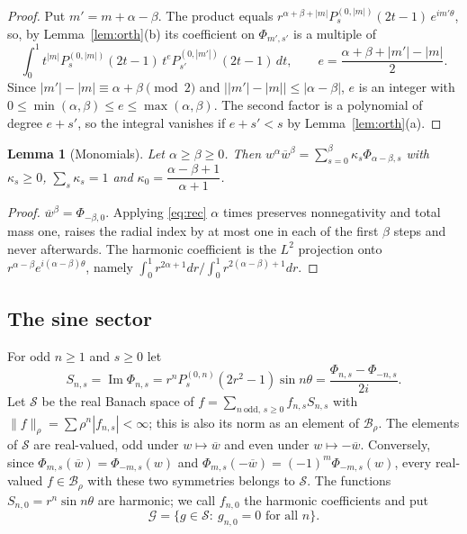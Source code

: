 \documentclass[11pt]{amsart}
\newtheorem{lemma}[theorem]{Lemma}
\theoremstyle{definition}
\theoremstyle{remark}
\numberwithin{equation}{section}
\newcommand{\Sc}{\mathcal{S}}
\newcommand{\Gc}{\mathcal{G}}
\newcommand{\Bc}{\mathcal{B}}
\newcommand{\bw}{\overline{w}}
\DeclareMathOperator{\im}{Im}
\newcommand{\nrm}[1]{\lVert #1\rVert}
\begin{document}
\begin{proof}
Put $m'=m+\alpha-\beta$. The product equals $r^{\alpha+\beta+|m|}P^{(0,|m|)}_s(2t-1)\,e^{im'\theta}$, so, by Lemma~\ref{lem:orth}(b) its coefficient on $\Phi_{m',s'}$ is a multiple of
\[
\int_0^1t^{|m|}P^{(0,|m|)}_s(2t-1)\,t^{e}P^{(0,|m'|)}_{s'}(2t-1)\,dt,\qquad e=\frac{\alpha+\beta+|m'|-|m|}2 .
\]
Since $|m'|-|m|\equiv\alpha+\beta\pmod 2$ and $\big||m'|-|m|\big|\leq|\alpha-\beta|$, $e$ is an integer with $0\leq\min(\alpha,\beta)\leq e\leq\max(\alpha,\beta)$. The second factor is a polynomial of degree $e+s'$, so the integral vanishes if $e+s'<s$ by Lemma~\ref{lem:orth}(a).
\end{proof}

\begin{lemma}[Monomials]\label{lem:monomial}
Let $\alpha\geq\beta\geq0$. Then $w^\alpha\bw^\beta=\sum_{s=0}^{\beta}\kappa_s\Phi_{\alpha-\beta,s}$ with $\kappa_s\geq0$, $\sum_s\kappa_s=1$ and $\kappa_0=\dfrac{\alpha-\beta+1}{\alpha+1}$.
\end{lemma}

\begin{proof}
$\bw^\beta=\Phi_{-\beta,0}$. Applying \eqref{eq:rec} $\alpha$ times preserves nonnegativity and total mass one, raises the radial index by at most one in each of the first $\beta$ steps and never afterwards. The harmonic coefficient is the $L^2$ projection onto $r^{\alpha-\beta}e^{i(\alpha-\beta)\theta}$, namely $\int_0^1r^{2\alpha+1}dr\big/\int_0^1r^{2(\alpha-\beta)+1}dr$.
\end{proof}

\subsection{The sine sector}
For odd $n\geq1$ and $s\geq0$ let
\[
S_{n,s}=\im\Phi_{n,s}=r^nP_s^{(0,n)}(2r^2-1)\sin n\theta=\frac{\Phi_{n,s}-\Phi_{-n,s}}{2i}.
\]
Let $\Sc$ be the real Banach space of $f=\sum_{n\ \mathrm{odd},\,s\geq0}f_{n,s}S_{n,s}$ with $\nrm f_\rho=\sum\rho^n|f_{n,s}|<\infty$; this is also its norm as an element of $\Bc_\rho$. The elements of $\Sc$ are real-valued, odd under $w\mapsto\bw$ and even under $w\mapsto-\bw$. Conversely, since $\Phi_{m,s}(\bw)=\Phi_{-m,s}(w)$ and $\Phi_{m,s}(-\bw)=(-1)^m\Phi_{-m,s}(w)$, every real-valued $f\in\Bc_\rho$ with these two symmetries belongs to $\Sc$. The functions $S_{n,0}=r^n\sin n\theta$ are harmonic; we call $f_{n,0}$ the harmonic coefficients and put
\[
\Gc=\{g\in\Sc:\ g_{n,0}=0\text{ for all }n\}.
\]

\end{document}
